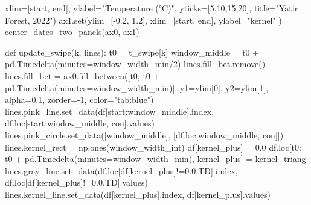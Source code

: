 \documentclass[
  letterpaper,
  DIV=11,
  numbers=noendperiod,
  oneside]{scrreprt}
\newenvironment{Shaded}{\begin{snugshade}}{\end{snugshade}}
\newcommand{\BuiltInTok}[1]{\textcolor[rgb]{0.00,0.23,0.31}{#1}}
\newcommand{\DecValTok}[1]{\textcolor[rgb]{0.68,0.00,0.00}{#1}}
\newcommand{\FloatTok}[1]{\textcolor[rgb]{0.68,0.00,0.00}{#1}}
\newcommand{\KeywordTok}[1]{\textcolor[rgb]{0.00,0.23,0.31}{#1}}
\newcommand{\NormalTok}[1]{\textcolor[rgb]{0.00,0.23,0.31}{#1}}
\newcommand{\OperatorTok}[1]{\textcolor[rgb]{0.37,0.37,0.37}{#1}}
\newcommand{\StringTok}[1]{\textcolor[rgb]{0.13,0.47,0.30}{#1}}
\begin{document}
\begin{Shaded}
\begin{Highlighting}[]
\NormalTok{        xlim}\OperatorTok{=}\NormalTok{[start, end],}
\NormalTok{        ylabel}\OperatorTok{=}\StringTok{"Temperature (°C)"}\NormalTok{,}
\NormalTok{        yticks}\OperatorTok{=}\NormalTok{[}\DecValTok{5}\NormalTok{,}\DecValTok{10}\NormalTok{,}\DecValTok{15}\NormalTok{,}\DecValTok{20}\NormalTok{],}
\NormalTok{        title}\OperatorTok{=}\StringTok{"Yatir Forest, 2022"}\NormalTok{)}
\NormalTok{ax1.}\BuiltInTok{set}\NormalTok{(ylim}\OperatorTok{=}\NormalTok{[}\OperatorTok{{-}}\FloatTok{0.2}\NormalTok{, }\FloatTok{1.2}\NormalTok{],}
\NormalTok{        xlim}\OperatorTok{=}\NormalTok{[start, end],}
\NormalTok{        ylabel}\OperatorTok{=}\StringTok{"kernel"}
\NormalTok{       )}
\NormalTok{center\_dates\_two\_panels(ax0, ax1)}

\KeywordTok{def}\NormalTok{ update\_swipe(k, lines):}
\NormalTok{    t0 }\OperatorTok{=}\NormalTok{ t\_swipe[k]}
\NormalTok{    window\_middle }\OperatorTok{=}\NormalTok{ t0 }\OperatorTok{+}\NormalTok{ pd.Timedelta(minutes}\OperatorTok{=}\NormalTok{window\_width\_min}\OperatorTok{/}\DecValTok{2}\NormalTok{)}
\NormalTok{    lines.fill\_bet.remove()}
\NormalTok{    lines.fill\_bet }\OperatorTok{=}\NormalTok{ ax0.fill\_between([t0, t0 }\OperatorTok{+}\NormalTok{ pd.Timedelta(minutes}\OperatorTok{=}\NormalTok{window\_width\_min)],}
\NormalTok{                                               y1}\OperatorTok{=}\NormalTok{ylim[}\DecValTok{0}\NormalTok{], y2}\OperatorTok{=}\NormalTok{ylim[}\DecValTok{1}\NormalTok{], alpha}\OperatorTok{=}\FloatTok{0.1}\NormalTok{, zorder}\OperatorTok{={-}}\DecValTok{1}\NormalTok{, color}\OperatorTok{=}\StringTok{"tab:blue"}\NormalTok{)}
\NormalTok{    lines.pink\_line.set\_data(df[start:window\_middle].index,}
\NormalTok{                             df.loc[start:window\_middle, }\StringTok{\textquotesingle{}con\textquotesingle{}}\NormalTok{].values)}
\NormalTok{    lines.pink\_circle.set\_data([window\_middle], [df.loc[window\_middle, }\StringTok{\textquotesingle{}con\textquotesingle{}}\NormalTok{]])}
\NormalTok{    lines.kernel\_rect }\OperatorTok{=}\NormalTok{ np.ones(window\_width\_int)}
\NormalTok{    df[}\StringTok{\textquotesingle{}kernel\_plus\textquotesingle{}}\NormalTok{] }\OperatorTok{=} \FloatTok{0.0}
\NormalTok{    df.loc[t0: t0 }\OperatorTok{+}\NormalTok{ pd.Timedelta(minutes}\OperatorTok{=}\NormalTok{window\_width\_min), }\StringTok{\textquotesingle{}kernel\_plus\textquotesingle{}}\NormalTok{] }\OperatorTok{=}\NormalTok{ kernel\_triang}
\NormalTok{    lines.gray\_line.set\_data(df.loc[df[}\StringTok{\textquotesingle{}kernel\_plus\textquotesingle{}}\NormalTok{]}\OperatorTok{!=}\FloatTok{0.0}\NormalTok{,}\StringTok{\textquotesingle{}TD\textquotesingle{}}\NormalTok{].index,}
\NormalTok{                             df.loc[df[}\StringTok{\textquotesingle{}kernel\_plus\textquotesingle{}}\NormalTok{]}\OperatorTok{!=}\FloatTok{0.0}\NormalTok{,}\StringTok{\textquotesingle{}TD\textquotesingle{}}\NormalTok{].values)}
\NormalTok{    lines.kernel\_line.set\_data(df[}\StringTok{\textquotesingle{}kernel\_plus\textquotesingle{}}\NormalTok{].index, df[}\StringTok{\textquotesingle{}kernel\_plus\textquotesingle{}}\NormalTok{].values)}


\end{Highlighting}
\end{Shaded}
\end{document}
